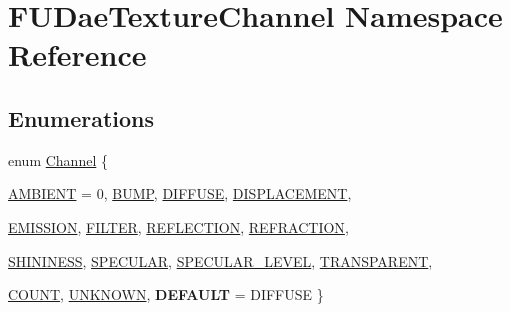 \hypertarget{namespaceFUDaeTextureChannel}{
\section{FUDaeTextureChannel Namespace Reference}
\label{namespaceFUDaeTextureChannel}
}
\subsection*{Enumerations}
\begin{DoxyCompactItemize}
\item 
enum \hyperlink{namespaceFUDaeTextureChannel_a816e9776262dffc532a4a8d94deadb35}{Channel} \{ \par
\hyperlink{namespaceFUDaeTextureChannel_a816e9776262dffc532a4a8d94deadb35a5efd5a13eb3a57206c85dda9bba0cf79}{AMBIENT} =  0, 
\hyperlink{namespaceFUDaeTextureChannel_a816e9776262dffc532a4a8d94deadb35a687b082c6508091c426e40aaf89d2806}{BUMP}, 
\hyperlink{namespaceFUDaeTextureChannel_a816e9776262dffc532a4a8d94deadb35ad1b12d009bc098fcaea00b9c7e125539}{DIFFUSE}, 
\hyperlink{namespaceFUDaeTextureChannel_a816e9776262dffc532a4a8d94deadb35acb4ff7f38fd7fd06634026a27a425c3d}{DISPLACEMENT}, 
\par
\hyperlink{namespaceFUDaeTextureChannel_a816e9776262dffc532a4a8d94deadb35ab19bd180d2ba08374124de8fd5770668}{EMISSION}, 
\hyperlink{namespaceFUDaeTextureChannel_a816e9776262dffc532a4a8d94deadb35afa8fe766b3c5f188b582a691e98a5ad2}{FILTER}, 
\hyperlink{namespaceFUDaeTextureChannel_a816e9776262dffc532a4a8d94deadb35a982ab309adfa210d99e5350797da2f21}{REFLECTION}, 
\hyperlink{namespaceFUDaeTextureChannel_a816e9776262dffc532a4a8d94deadb35acca3aa5f934126ede31413acb57144a4}{REFRACTION}, 
\par
\hyperlink{namespaceFUDaeTextureChannel_a816e9776262dffc532a4a8d94deadb35a184596ee67ff2eac79fd02a6e29bf684}{SHININESS}, 
\hyperlink{namespaceFUDaeTextureChannel_a816e9776262dffc532a4a8d94deadb35a69b7e3a3713ec2ce5124ef60996fbb73}{SPECULAR}, 
\hyperlink{namespaceFUDaeTextureChannel_a816e9776262dffc532a4a8d94deadb35a63139151c237ad5498125967091f648f}{SPECULAR\_\-LEVEL}, 
\hyperlink{namespaceFUDaeTextureChannel_a816e9776262dffc532a4a8d94deadb35a29235b2ae5bc3ef6f99e35e0ee40370e}{TRANSPARENT}, 
\par
\hyperlink{namespaceFUDaeTextureChannel_a816e9776262dffc532a4a8d94deadb35abdef7bc533978dedf966658b80a0c75c}{COUNT}, 
\hyperlink{namespaceFUDaeTextureChannel_a816e9776262dffc532a4a8d94deadb35a01789d6c4b8547a36e5e0ec666b90f42}{UNKNOWN}, 
{\bfseries DEFAULT} =  DIFFUSE
 \}
\end{DoxyCompactItemize}
